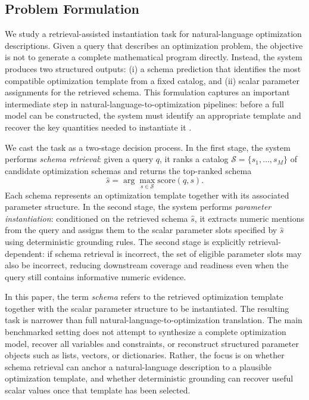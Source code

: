 \documentclass[3p]{elsarticle}
\begin{document}
\subsection{Problem Formulation}
\label{subsec:method_problem}

We study a retrieval-assisted instantiation task for natural-language optimization descriptions. Given a query that describes an optimization problem, the objective is not to generate a complete mathematical program directly. Instead, the system produces two structured outputs: (i) a schema prediction that identifies the most compatible optimization template from a fixed catalog, and (ii) scalar parameter assignments for the retrieved schema. This formulation captures an important intermediate step in natural-language-to-optimization pipelines: before a full model can be constructed, the system must identify an appropriate template and recover the key quantities needed to instantiate it \cite{nlp4lp_dataset,ramamonjison2023nl4opt,ahmaditeshnizi2024optimus_icml}.

We cast the task as a two-stage decision process. In the first stage, the system performs \emph{schema retrieval}: given a query $q$, it ranks a catalog $\mathcal{S}=\{s_1,\dots,s_M\}$ of candidate optimization schemas and returns the top-ranked schema
\begin{equation}
\hat{s}=\arg\max_{s \in \mathcal{S}} \mathrm{score}(q,s).
\label{eq:top1_schema}
\end{equation}
Each schema represents an optimization template together with its associated parameter structure. In the second stage, the system performs \emph{parameter instantiation}: conditioned on the retrieved schema $\hat{s}$, it extracts numeric mentions from the query and assigns them to the scalar parameter slots specified by $\hat{s}$ using deterministic grounding rules. The second stage is explicitly retrieval-dependent: if schema retrieval is incorrect, the set of eligible parameter slots may also be incorrect, reducing downstream coverage and readiness even when the query still contains informative numeric evidence.

In this paper, the term \emph{schema} refers to the retrieved optimization template together with the scalar parameter structure to be instantiated. The resulting task is narrower than full natural-language-to-optimization translation. The main benchmarked setting does not attempt to synthesize a complete optimization model, recover all variables and constraints, or reconstruct structured parameter objects such as lists, vectors, or dictionaries. Rather, the focus is on whether schema retrieval can anchor a natural-language description to a plausible optimization template, and whether deterministic grounding can recover useful scalar values once that template has been selected.
\end{document}
